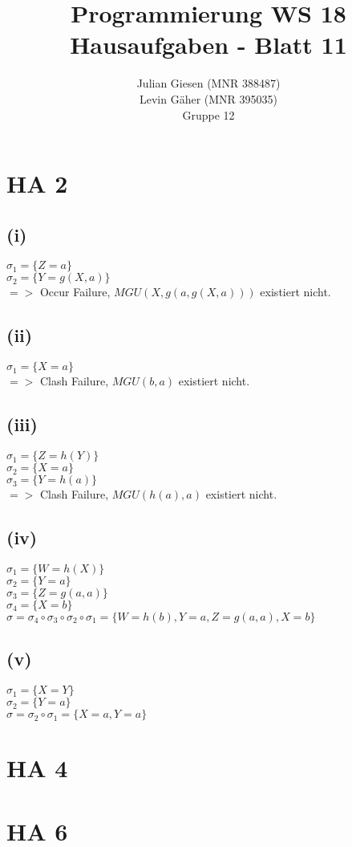 \documentclass[a4paper]{article}
\title{ Programmierung WS 18 \\ Hausaufgaben - Blatt 11 }
\author{ Julian Giesen (MNR 388487) \\
Levin Gäher (MNR 395035) \\
Gruppe 12 }
\date{  }
\begin{document}
\maketitle

\section*{ HA 2 }
\subsection*{(i)}
$\sigma_1 = \{Z = a\}$\\
$\sigma_2 = \{Y = g(X,a)\}$\\
$=>$ Occur Failure, $MGU (X, g(a,g(X,a)))$ existiert nicht.

\subsection*{(ii)}
$\sigma_1 = \{X = a\}$\\
$=>$ Clash Failure, $MGU(b,a)$ existiert nicht.
\subsection*{(iii)}
$\sigma_1 = \{Z = h(Y)\}$\\
$\sigma_2 = \{X = a\}$\\
$\sigma_3 = \{Y = h(a)\}$\\
$=>$ Clash Failure, $MGU(h(a),a)$ existiert nicht.
\subsection*{(iv)}
$\sigma_1 = \{W = h(X)\}$\\
$\sigma_2 = \{Y = a\}$\\
$\sigma_3 = \{Z = g(a,a)\}$\\
$\sigma_4 = \{X = b\}$\\
$\sigma = \sigma_4 \circ \sigma_3 \circ \sigma_2 \circ \sigma_1= \{W = h(b), Y=a, Z = g(a,a), X =b\}$
\subsection*{(v)}
$\sigma_1 = \{X = Y\}$\\
$\sigma_2 = \{Y = a\}$\\
$\sigma = \sigma_2 \circ \sigma_1 = \{X = a, Y = a\}$


\section*{ HA 4 }

\section*{ HA 6}
\end{document}
